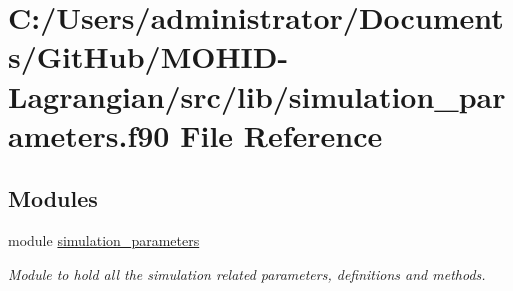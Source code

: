 \hypertarget{simulation__parameters_8f90}{}\section{C\+:/\+Users/administrator/\+Documents/\+Git\+Hub/\+M\+O\+H\+I\+D-\/\+Lagrangian/src/lib/simulation\+\_\+parameters.f90 File Reference}
\label{simulation__parameters_8f90}
\subsection*{Modules}
\begin{DoxyCompactItemize}
\item 
module \mbox{\hyperlink{namespacesimulation__parameters}{simulation\+\_\+parameters}}
\begin{DoxyCompactList}\small\item\em Module to hold all the simulation related parameters, definitions and methods. \end{DoxyCompactList}\end{DoxyCompactItemize}
